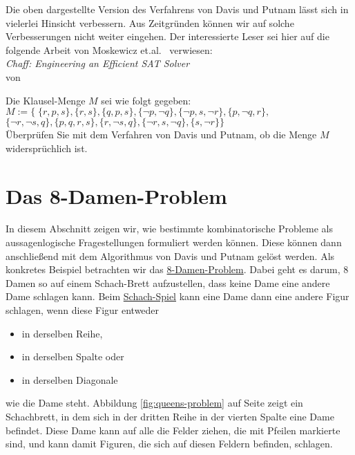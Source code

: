 Die oben dargestellte Version des Verfahrens von Davis und Putnam lässt sich in vielerlei
Hinsicht verbessern.  Aus Zeitgründen können wir auf solche Verbesserungen nicht
weiter eingehen. Der interessierte Leser sei hier auf die folgende Arbeit von Moskewicz
et.al.~\cite{moskewicz:2001}  verwiesen: 
\\[0.2cm]
\hspace*{1.3cm} \textsl{Chaff: Engineering an Efficient SAT Solver} \\
\hspace*{1.3cm} von  

\exercise
Die Klausel-Menge $M$ sei wie folgt gegeben: \\[0.2cm]
\hspace*{1.3cm} $M := \bigl\{ \; \{ r, p, s \},
                         \{r, s \}, \{ q, p, s \},
                         \{ \neg p,  \neg q\},
                         \{ \neg p, s,  \neg r\},
                         \{p,  \neg q, r \},$ \\[0.2cm]
\hspace*{2.6cm} $\{ \neg r,  \neg s, q\},
                         \{p, q, r, s \},
                         \{r,  \neg s, q\},
                         \{ \neg r,  s, \neg q\},
                         \{s, \neg r\} \bigr\}$ \\[0.2cm]
Überprüfen Sie mit dem Verfahren von Davis und Putnam, ob die Menge $M$ widersprüchlich ist.  
\eox


\section{Das 8-Damen-Problem}
In diesem Abschnitt zeigen wir, wie bestimmte kombinatorische Probleme als aussagenlogische Fragestellungen
formuliert werden können.  Diese können dann anschließend mit dem Algorithmus von Davis und Putnam gelöst werden.  Als
konkretes Beispiel betrachten wir das \href{https://en.wikipedia.org/wiki/Eight_queens_puzzle}{8-Damen-Problem}.  
Dabei geht es darum, 8 Damen so auf einem Schach-Brett aufzustellen, dass keine Dame eine andere Dame schlagen kann.
Beim \href{https://en.wikipedia.org/wiki/Chess}{Schach-Spiel} kann eine Dame dann eine andere Figur schlagen,
wenn diese Figur entweder 
\begin{itemize}
\item in derselben Reihe,
\item in derselben Spalte  oder
\item in derselben Diagonale
\end{itemize}
wie die Dame steht.  Abbildung \ref{fig:queens-problem} auf Seite \pageref{fig:queens-problem}
zeigt ein Schachbrett, in dem sich in der dritten Reihe in der vierten Spalte
eine Dame befindet.  Diese Dame kann auf alle die Felder ziehen, die mit Pfeilen markierte
sind, und kann damit Figuren, die sich auf diesen Feldern befinden, schlagen.

